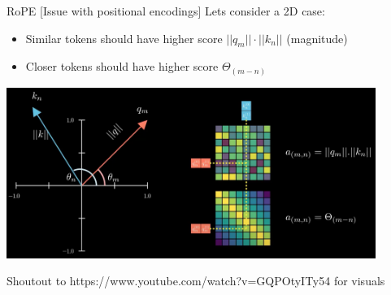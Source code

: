 \documentclass{beamer}
\begin{document}
\begin{frame}[t]{RoPE [Issue with positional encodings]}
    Lets consider a 2D case:
    \begin{itemize}[label=-]
        \item Similar tokens should have higher score $||q_m|| \cdot ||k_n||$ (magnitude) 
        \item Closer tokens should have higher score $\Theta_{(m-n)}$
    \end{itemize}
    \begin{center}
        \includegraphics[width=0.9\textwidth]{./img/rope_1.png}
    \end{center}
    \small Shoutout to https://www.youtube.com/watch?v=GQPOtyITy54 for visuals
    \normalsize
\end{frame}
\end{document}
